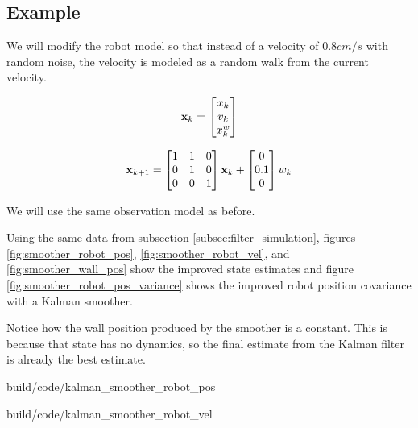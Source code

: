 \subsection{Example}

We will modify the robot model so that instead of a velocity of $0.8 cm/s$ with
random noise, the velocity is modeled as a random walk from the current
velocity.

\begin{equation}
  \mathbf{x}_k =
  \begin{bmatrix}
    x_k \\
    v_k \\
    x_k^w
  \end{bmatrix}
\end{equation}

\begin{equation}
  \mathbf{x}_{k+1} =
  \begin{bmatrix}
    1 & 1 & 0 \\
    0 & 1 & 0 \\
    0 & 0 & 1
  \end{bmatrix} \mathbf{x}_k +
  \begin{bmatrix}
    0 \\
    0.1 \\
    0
  \end{bmatrix} w_k
\end{equation}

We will use the same observation model as before.

Using the same data from subsection \ref{subsec:filter_simulation}, figures
\ref{fig:smoother_robot_pos}, \ref{fig:smoother_robot_vel}, and
\ref{fig:smoother_wall_pos} show the improved \gls{state} estimates and figure
\ref{fig:smoother_robot_pos_variance} shows the improved robot position
covariance with a Kalman smoother.

Notice how the wall position produced by the smoother is a constant. This is
because that \gls{state} has no dynamics, so the final estimate from the Kalman
filter is already the best estimate.

\begin{svg}{build/code/kalman_smoother_robot_pos}
  \caption{Robot position with Kalman smoother}
  \label{fig:smoother_robot_pos}
\end{svg}

\begin{svg}{build/code/kalman_smoother_robot_vel}
  \caption{Robot velocity with Kalman smoother}
  \label{fig:smoother_robot_vel}
\end{svg}

